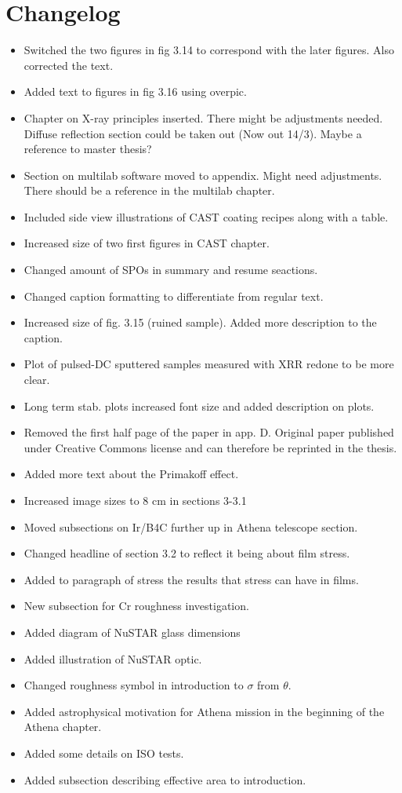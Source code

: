 \chapter{Changelog}

\begin{itemize}
  \item Switched the two figures in fig 3.14 to correspond with the later figures. Also corrected the text.
  \item Added text to figures in fig 3.16 using overpic.
  \item Chapter on X-ray principles inserted. There might be adjustments needed. Diffuse reflection section could be taken out (Now out 14/3). Maybe a reference to master thesis?
  \item Section on multilab software moved to appendix. Might need adjustments. There should be a reference in the multilab chapter.
  \item Included side view illustrations of CAST coating recipes along with a table.
  \item Increased size of two first figures in CAST chapter.
  \item Changed amount of SPOs in summary and resume seactions.
  \item Changed caption formatting to differentiate from regular text.
  \item Increased size of fig. 3.15 (ruined sample). Added more description to the caption.
  \item Plot of pulsed-DC sputtered samples measured with XRR redone to be more clear.
  \item Long term stab. plots increased font size and added description on plots.
  \item Removed the first half page of the paper in app. D. Original paper published under Creative Commons license and can therefore be reprinted in the thesis.
  \item Added more text about the Primakoff effect.
  \item Increased image sizes to 8 cm in sections 3-3.1
  \item Moved subsections on Ir/B4C further up in Athena telescope section.
  \item Changed headline of section 3.2 to reflect it being about film stress.
  \item Added to paragraph of stress the results that stress can have in films.
  \item New subsection for Cr roughness investigation.
  \item Added diagram of NuSTAR glass dimensions
  \item Added illustration of NuSTAR optic.
  \item Changed roughness symbol in introduction to $\sigma$ from $\theta$.
  \item Added astrophysical motivation for Athena mission in the beginning of the Athena chapter.
  \item Added some details on ISO tests.
  \item Added subsection describing effective area to introduction.
\end{itemize}

